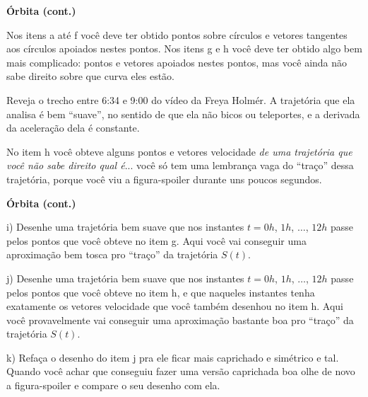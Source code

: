 \documentclass[oneside,12pt]{article}
\begin{document}
\newpage


{\bf Órbita (cont.)}

Nos itens a até f você deve ter obtido pontos sobre círculos e vetores
tangentes aos círculos apoiados nestes pontos. Nos itens g e h você
deve ter obtido algo bem mais complicado: pontos e vetores apoiados
nestes pontos, mas você ainda não sabe direito sobre que curva eles
estão.

Reveja o trecho entre 6:34 e 9:00 do vídeo da Freya Holmér. A
trajetória que ela analisa é bem ``suave'', no sentido de que ela não
bicos ou teleportes, e a derivada da aceleração dela é constante.

No item h você obteve alguns pontos e vetores velocidade {\sl de uma
  trajetória que você não sabe direito qual é}... você só tem uma
lembrança vaga do ``traço'' dessa trajetória, porque você viu a
figura-spoiler durante uns poucos segundos.

\newpage


{\bf Órbita (cont.)}

\msk

i) Desenhe uma trajetória bem suave que nos instantes $t=0h$, $1h$,
$\ldots$, $12h$ passe pelos pontos que você obteve no item g. Aqui
você vai conseguir uma aproximação bem tosca pro ``traço'' da
trajetória $S(t)$.

\msk

j) Desenhe uma trajetória bem suave que nos instantes $t=0h$, $1h$,
$\ldots$, $12h$ passe pelos pontos que você obteve no item h, e que
naqueles instantes tenha exatamente os vetores velocidade que você
também desenhou no item h. Aqui você provavelmente vai conseguir uma
aproximação bastante boa pro ``traço'' da trajetória $S(t)$.

\msk

k) Refaça o desenho do item j pra ele ficar mais caprichado e
simétrico e tal. Quando você achar que conseguiu fazer uma versão
caprichada boa olhe de novo a figura-spoiler e compare o seu desenho
com ela.






\end{document}
